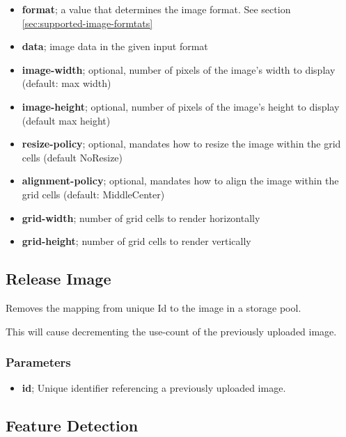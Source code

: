\documentclass{article}
\begin{document}
\begin{itemize}
    \item \textbf{format}; a value that determines the image format. See section \ref{sec:supported-image-formtats}
    \item \textbf{data}; image data in the given input format
    \item \textbf{image-width}; optional, number of pixels of the image's width to display (default: max width)
    \item \textbf{image-height}; optional, number of pixels of the image's height to display (default max height)
    \item \textbf{resize-policy}; optional, mandates how to resize the image within the grid cells (default NoResize)
    \item \textbf{alignment-policy}; optional, mandates how to align the image within the grid cells (default: MiddleCenter)
    \item \textbf{grid-width}; number of grid cells to render horizontally
    \item \textbf{grid-height}; number of grid cells to render vertically
\end{itemize}


\subsection{Release Image}

Removes the mapping from unique Id to the image in a storage pool.

This will cause decrementing the use-count of the previously uploaded image.

\subsubsection*{Parameters}

\begin{itemize}
    \item \textbf{id}; Unique identifier referencing a previously uploaded image.
\end{itemize}

\subsection{Feature Detection}
\end{document}

